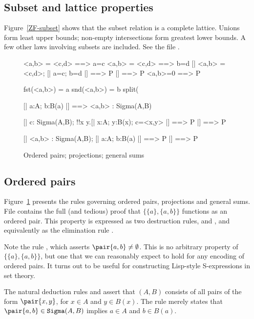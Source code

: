 \subsection{Subset and lattice properties}
Figure~\ref{ZF-subset} shows that the subset relation is a complete
lattice.  Unions form least upper bounds; non-empty intersections form
greatest lower bounds.  A few other laws involving subsets are included.
See the file .


\begin{figure}
\begin{ttbox}
    <a,b> = <c,d> ==> a=c
    <a,b> = <c,d> ==> b=d
     [| <a,b> = <c,d>;  [| a=c; b=d |] ==> P |] ==> P
      <a,b>=0 ==> P

       fst(<a,b>) = a
       snd(<a,b>) = b
     split(%

    [| a:A;  b:B(a) |] ==> <a,b> : Sigma(A,B)

    [| c: Sigma(A,B);  
             !!x y.[| x:A; y:B(x); c=<x,y> |] ==> P |] ==> P

   [| <a,b> : Sigma(A,B);    
             [| a:A;  b:B(a) |] ==> P   |] ==> P
\end{ttbox}
\caption{Ordered pairs; projections; general sums} \label{ZF-pair}
\end{figure}


\subsection{Ordered pairs}
Figure~\ref{ZF-pair} presents the rules governing ordered pairs,
projections and general sums.  File  contains the
full (and tedious) proof that $\{\{a\},\{a,b\}\}$ functions as an ordered
pair.  This property is expressed as two destruction rules,
 and , and equivalently
as the elimination rule .

Note the rule , which asserts
$\pair{a,b}\neq\emptyset$.  This is no arbitrary property of
$\{\{a\},\{a,b\}\}$, but one that we can reasonably expect to hold for any
encoding of ordered pairs.  It turns out to be useful for constructing
Lisp-style S-expressions in set theory.

The natural deduction rules  and 
assert that $(A,B)$ consists of all pairs of the form
$\pair{x,y}$, for $x\in A$ and $y\in B(x)$.  The rule 
merely states that $\pair{a,b}\in {\tt Sigma}(A,B)$ implies $a\in A$ and
$b\in B(a)$.


